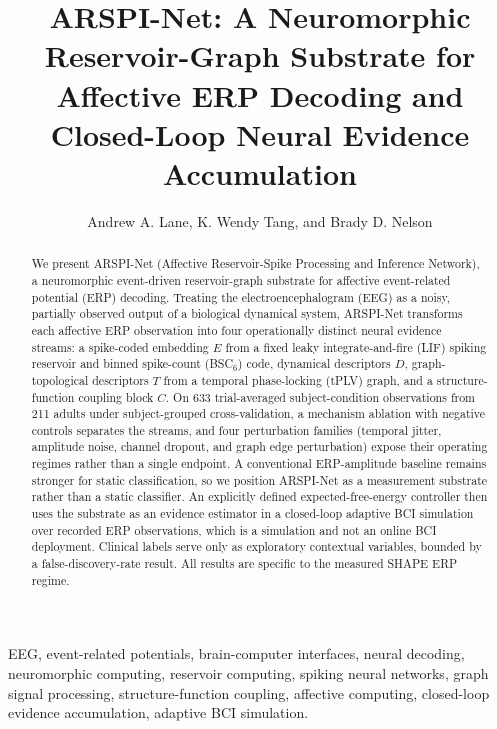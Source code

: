 \documentclass[journal]{IEEEtran}
\begin{document}
\title{ARSPI-Net: A Neuromorphic Reservoir-Graph Substrate for Affective ERP Decoding and Closed-Loop Neural Evidence Accumulation}

\author{Andrew A. Lane, K. Wendy Tang, and Brady D. Nelson}

\maketitle

\begin{abstract}
We present ARSPI-Net (Affective Reservoir-Spike Processing and Inference Network), a neuromorphic event-driven reservoir-graph substrate for affective event-related potential (ERP) decoding. Treating the electroencephalogram (EEG) as a noisy, partially observed output of a biological dynamical system, ARSPI-Net transforms each affective ERP observation into four operationally distinct neural evidence streams: a spike-coded embedding $E$ from a fixed leaky integrate-and-fire (LIF) spiking reservoir and binned spike-count (BSC$_6$) code, dynamical descriptors $D$, graph-topological descriptors $T$ from a temporal phase-locking (tPLV) graph, and a structure-function coupling block $C$. On 633 trial-averaged subject-condition observations from 211 adults under subject-grouped cross-validation, a mechanism ablation with negative controls separates the streams, and four perturbation families (temporal jitter, amplitude noise, channel dropout, and graph edge perturbation) expose their operating regimes rather than a single endpoint. A conventional ERP-amplitude baseline remains stronger for static classification, so we position ARSPI-Net as a measurement substrate rather than a static classifier. An explicitly defined expected-free-energy controller then uses the substrate as an evidence estimator in a closed-loop adaptive BCI simulation over recorded ERP observations, which is a simulation and not an online BCI deployment. Clinical labels serve only as exploratory contextual variables, bounded by a false-discovery-rate result. All results are specific to the measured SHAPE ERP regime.
\end{abstract}

\begin{IEEEkeywords}
EEG, event-related potentials, brain-computer interfaces, neural decoding, neuromorphic computing, reservoir computing, spiking neural networks, graph signal processing, structure-function coupling, affective computing, closed-loop evidence accumulation, adaptive BCI simulation.
\end{IEEEkeywords}
\end{document}
